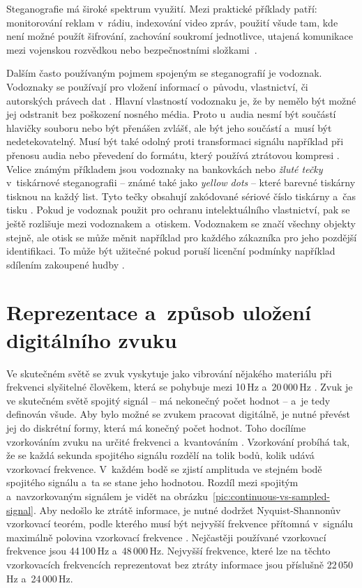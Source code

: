 Steganografie má široké spektrum využití. Mezi praktické příklady patří:
monitorování reklam v~rádiu, indexování video zpráv, použití všude tam, kde
není možné použít šifrování, zachování soukromí jednotlivce, utajená komunikace
mezi vojenskou rozvědkou nebo bezpečnostními složkami~\cite{Dutta2020}.

Dalším často používaným pojmem spojeným se steganografií je vodoznak. Vodoznaky
se používají pro vložení informací o~původu, vlastnictví, či autorských právech
dat \cite{Djebbar2012}\cite{Dutta2020}\cite{Swanson1998}. Hlavní vlastností
vodoznaku je, že by nemělo být možné jej odstranit bez poškození nosného média.
Proto u~audia nesmí být součástí hlavičky souboru nebo být přenášen zvlášť, ale
být jeho součástí a~musí být nedetekovatelný. Musí být také odolný proti
transformaci signálu například při přenosu audia nebo převedení do formátu,
který používá ztrátovou kompresi \cite{Swanson1998}. Velice známým příkladem
jsou vodoznaky na bankovkách nebo \textit{žluté tečky} v~tiskárnové
steganografii -- známé také jako \textit{yellow dots} -- které barevné tiskárny
tisknou na každý list. Tyto tečky obsahují zakódované sériové číslo tiskárny
a~čas tisku \cite{Dutta2020}. Pokud je vodoznak použit pro ochranu
intelektuálního vlastnictví, pak se ještě rozlišuje mezi vodoznakem a~otiskem.
Vodoznakem se značí všechny objekty stejně, ale otisk se může měnit například
pro každého zákazníka pro jeho pozdější identifikaci. To může být užitečné
pokud poruší licenční podmínky například sdílením zakoupené hudby
\cite{Swanson1998}.

\section{Reprezentace a~způsob uložení digitálního zvuku}
\label{sec:digital-sound-representation}

Ve skutečném světě se zvuk vyskytuje jako vibrování nějakého materiálu při
frekvenci slyšitelné člověkem, která se pohybuje mezi 10\,Hz a~20\,000\,Hz
\cite{Swanson1998}. Zvuk je ve skutečném světě spojitý signál -- má nekonečný
počet hodnot -- a~je tedy definován všude. Aby bylo možné se zvukem pracovat
digitálně, je nutné převést jej do diskrétní formy, která má konečný počet
hodnot. Toho docílíme vzorkováním zvuku na určité frekvenci a~kvantováním
\cite{Cernocky2021}. Vzorkování probíhá tak, že se každá sekunda spojitého
signálu rozdělí na tolik bodů, kolik udává vzorkovací frekvence. V~každém bodě
se zjistí amplituda ve stejném bodě spojitého signálu a~ta se stane jeho
hodnotou. Rozdíl mezi spojitým a~navzorkovaným signálem je vidět na
obrázku~\ref{pic:continuous-vs-sampled-signal}. Aby nedošlo ke ztrátě
informace, je nutné dodržet Nyquist-Shannonův vzorkovací teorém, podle kterého
musí být nejvyšší frekvence přítomná v~signálu maximálně polovina vzorkovací
frekvence \cite{Shannon1949}. Nejčastěji používané vzorkovací frekvence jsou
44\,100\,Hz a~48\,000\,Hz. Nejvyšší frekvence, které lze na těchto vzorkovacích
frekvencích reprezentovat bez ztráty informace jsou příslušně 22\,050\,Hz
a~24\,000\,Hz.

